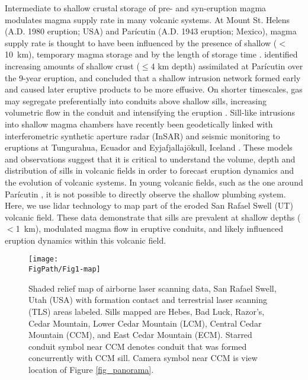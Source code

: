 Intermediate to shallow crustal storage of pre- and syn-eruption magma modulates magma supply rate in many volcanic systems. At Mount St. Helens (A.D. 1980 eruption; USA) and Parícutin (A.D. 1943 eruption; Mexico), magma supply rate is thought to have been influenced by the presence of shallow ($<$10~km), temporary magma storage \citep{cashman2005multiple} and by the length of storage time \citep{scandone2007magma}. \citet{erlund2010compositional} identified increasing amounts of shallow crust ($\le$4 km depth) assimilated at Parícutin over the 9-year eruption, and concluded that a shallow intrusion network formed early and caused later eruptive products to be more effusive. On shorter timescales, gas may segregate preferentially into conduits above shallow sills, increasing volumetric flow in the conduit and intensifying the eruption \citep{conte2000experimental,pioli2009controls}. Sill-like intrusions into shallow magma chambers have recently been geodetically linked with interferometric synthetic aperture radar (InSAR) and seismic monitoring to eruptions at Tungurahua, Ecuador \citep{biggs2010stratovolcano} and Eyjafjallaj\"{o}kull, Iceland \citep{tarasewicz2012magma}. These models and observations suggest that it is critical to understand the volume, depth and distribution of sills in volcanic fields in order to forecast eruption dynamics and the evolution of volcanic systems. In young volcanic fields, such as the one around Parícutin \citep{connor1990cinder}, it is not possible to directly observe the shallow plumbing system. Here, we use lidar technology to map part of the eroded San Rafael Swell (UT) volcanic field. These data demonstrate that sills are prevalent at shallow depths ($<$1~km), modulated magma flow in eruptive conduits, and likely influenced eruption dynamics within this volcanic field.

\begin{figure}
\centering
\texttt{[image: \\FigPath/Fig1-map]}
\caption[Shaded relief map of airborne laser scanning data, San Rafael Swell, Utah (USA) with formation contact and terrestrial laser scanning (TLS) areas labeled]{Shaded relief map of airborne laser scanning data, San Rafael Swell, Utah (USA) with formation contact and terrestrial laser scanning (TLS) areas labeled. Sills mapped are Hebes, Bad Luck, Razor’s, Cedar Mountain, Lower Cedar Mountain (LCM), Central Cedar Mountain (CCM), and East Cedar Mountain (ECM). Starred conduit symbol near CCM denotes conduit that was formed concurrently with CCM sill. Camera symbol near CCM is view location of Figure \ref{fig_panorama}.}
\label{fig_map}
\end{figure}

